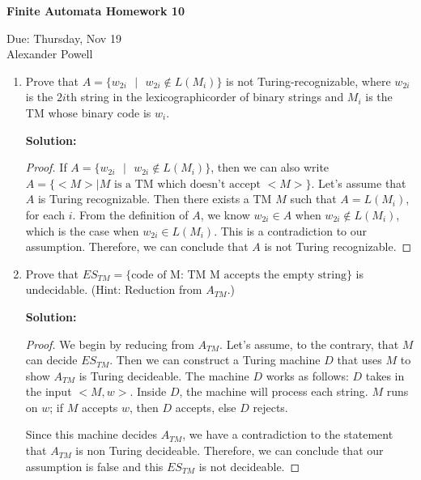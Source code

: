 \documentclass[11pt]{article}
\begin{document}
\begin{center}             %
\begin{LARGE}
{\bf Finite Automata Homework 10}
\end{LARGE}
\vskip 0.25cm      %

Due: Thursday, Nov 19\\  %
Alexander Powell
\end{center}

\begin{enumerate}

\item Prove that $A = \{ w_{2i}\text{ }|\text{ }w_{2i} \not \in L(M_i) \}$ is not Turing-recognizable, where $w_{2i}$ is the $2i$th string in the lexicographicorder of binary strings and $M_i$ is the TM whose binary code is $w_i$.

\textbf{Solution: }
\begin{proof}

If $A = \{ w_{2i}\text{ }|\text{ }w_{2i} \not \in L(M_i) \}$, then we can also write $A = \{ <M>|M \text{ is a TM which doesn't accept }<M> \}$.  Let's assume that $A$ is Turing recognizable.  Then there exists a TM $M$ such that $A = L(M_i)$, for each $i$.  From the definition of $A$, we know $w_{2i} \in A$ when $w_{2i} \not \in L(M_i)$, which is the case when $w_{2i} \in L(M_i)$.  This is a contradiction to our assumption.  Therefore, we can conclude that $A$ is not Turing recognizable.  

\end{proof}

\item Prove that $ES_{TM} = \{ \text{code of M: TM M accepts the empty string} \}$ is undecidable. (Hint: Reduction from $A_{TM}$.)

\textbf{Solution: }
\begin{proof}

We begin by reducing from $A_{TM}$.  Let's assume, to the contrary, that $M$ can decide $ES_{TM}$.  Then we can construct a Turing machine $D$ that uses $M$ to show $A_{TM}$ is Turing decideable.  The machine $D$ works as follows:
$D$ takes in the input $<M,w>$.  Inside $D$, the machine will process each string.  $M$ runs on $w$; if $M$ accepts $w$, then $D$ accepts, else $D$ rejects.  

Since this machine decides $A_{TM}$, we have a contradiction to the statement that $A_{TM}$ is non Turing decideable.  
Therefore, we can conclude that our assumption is false and this $ES_{TM}$ is not decideable.  


\end{proof}
\end{enumerate}
\end{document}
